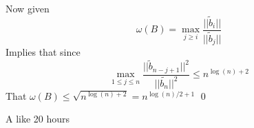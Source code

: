 \documentclass[12pt]{amsart}
\begin{document}
\begin{problem}
\begin{subproblem}
      Now given 
      \[\omega(B) = \max_{j\geq i}\frac{||\tilde{b}_i||}{||\tilde{b}_j||}\]
      Implies that since 
    \[\max_{1\leq j\leq n}\frac{||\tilde{b}_{n-j+1}||^2}{||\tilde{b_n}||^2}\leq n^{\log(n)+2}\]
    That $\omega(B) \leq \sqrt{n^{\log(n)+2}} = n^{\log(n)/2 + 1}$ \qed

%

      
    \end{subproblem}
  \end{problem}
  \begin{problem}
    A like 20 hours 
  \end{problem}
\end{document}
